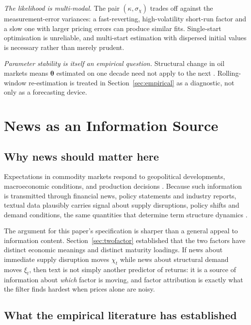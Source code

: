 \documentclass[journal]{IEEEtran}
\begin{document}
\emph{The likelihood is multi-modal.} The pair $(\kappa, \sigma_\chi)$ trades off against the measurement-error variances: a fast-reverting, high-volatility short-run factor and a slow one with larger pricing errors can produce similar fits. Single-start optimisation is unreliable, and multi-start estimation with dispersed initial values is necessary rather than merely prudent.

\emph{Parameter stability is itself an empirical question.} Structural change in oil markets means $\bm{\theta}$ estimated on one decade need not apply to the next \cite{Pindyck1999, HamiltonWu2014, Cortazar2022}. Rolling-window re-estimation is treated in Section~\ref{sec:empirical} as a diagnostic, not only as a forecasting device.

\section{News as an Information Source}
\label{sec:news}

\subsection{Why news should matter here}

Expectations in commodity markets respond to geopolitical developments, macroeconomic conditions, and production decisions \cite{KilianMurphy2014, Pindyck1999}. Because such information is transmitted through financial news, policy statements and industry reports, textual data plausibly carries signal about supply disruptions, policy shifts and demand conditions, the same quantities that determine term structure dynamics \cite{HamiltonWu2014, Cortazar2022}.

The argument for this paper's specification is sharper than a general appeal to information content. Section~\ref{sec:twofactor} established that the two factors have distinct economic meanings and distinct maturity loadings. If news about immediate supply disruption moves $\chi_t$ while news about structural demand moves $\xi_t$, then text is not simply another predictor of returns: it is a source of information about \emph{which} factor is moving, and factor attribution is exactly what the filter finds hardest when prices alone are noisy.

\subsection{What the empirical literature has established}
\end{document}
